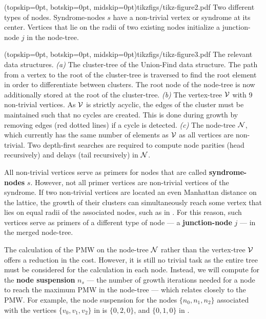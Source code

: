 \Figure[htb](topskip=0pt, botskip=0pt, midskip=0pt){tikzfigs/tikz-figure2.pdf}{
    Two different types of nodes. Syndrome-nodes $s$ have a non-trivial vertex or syndrome at its center. Vertices that lie on the radii of two existing nodes initialize a junction-node $j$ in the node-tree.\label{fig2}}

\Figure[hbt](topskip=0pt, botskip=0pt, midskip=0pt){tikzfigs/tikz-figure3.pdf}{
    The relevant data structures. \emph{(a)} The cluster-tree of the Union-Find data structure. The path from a vertex to the root of the cluster-tree is traversed to find the root element in order to differentiate between clusters. The root node of the node-tree is now additionally stored at the root of the cluster-tree. \emph{(b)} The vertex-tree $\mathcal{V}$ with 9 non-trivial vertices. As $\mathcal{V}$ is strictly acyclic, the edges of the cluster must be maintained such that no cycles are created. This is done during growth by removing edges (red dotted lines) if a cycle is detected. \emph{(c)} The node-tree $\mathcal{N}$, which currently has the same number of elements as $\mathcal{V}$ as all vertices are non-trivial. Two depth-first searches are required to compute node parities (head recursively) and delays (tail recursively) in $\mathcal{N}$.\label{fig3}}

All non-trivial vertices serve as primers for nodes that are called \textbf{syndrome-nodes} $s$. However, not all primer vertices are non-trivial vertices of the syndrome. If two non-trivial vertices are located an even Manhattan distance on the lattice, the growth of their clusters can simultaneously reach some vertex that lies on equal radii of the associated nodes, such as in . For this reason, such vertices serve as primers of a different type of node --- a \textbf{junction-node} $j$ --- in the merged node-tree. 

The calculation of the PMW on the node-tree $\mathcal{N}$ rather than the vertex-tree $\mathcal{V}$ offers a reduction in the cost. However, it is still no trivial task as the entire tree must be considered for the calculation in each node. Instead, we will compute for the \textbf{node suspension} $n_s$ --- the number of growth iterations needed for a node to reach the maximum PMW in the node-tree --- which relates closely to the PMW. For example, the node suspension for the nodes $\{n_0, n_1, n_2\}$ associated with the vertices $\{v_0, v_1, v_2\}$ in  is $\{0, 2, 0\}$, and $\{0, 1, 0\}$ in .

